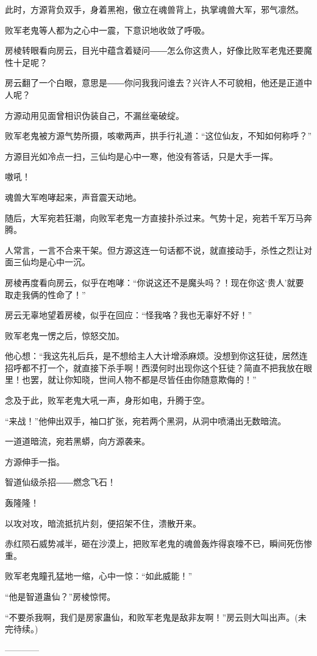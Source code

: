 \begin{this_body}
此时，方源背负双手，身着黑袍，傲立在魂兽背上，执掌魂兽大军，邪气凛然。

败军老鬼等人都为之心中一震，下意识地收敛了呼吸。

房棱转眼看向房云，目光中蕴含着疑问――怎么你这贵人，好像比败军老鬼还要魔性十足呢？

房云翻了一个白眼，意思是――你问我我问谁去？兴许人不可貌相，他还是正道中人呢？

方源动用见面曾相识伪装自己，不漏丝毫破绽。

败军老鬼被方源气势所摄，咳嗽两声，拱手行礼道：“这位仙友，不知如何称呼？”

方源目光如冷点一扫，三仙均是心中一寒，他没有答话，只是大手一挥。

嗷吼！

魂兽大军咆哮起来，声音震天动地。

随后，大军宛若狂潮，向败军老鬼一方直接扑杀过来。气势十足，宛若千军万马奔腾。

人常言，一言不合来干架。但方源这连一句话都不说，就直接动手，杀性之烈让对面三仙均是心中一沉。

房棱再度看向房云，似乎在咆哮：“你说这还不是魔头吗？！现在你这‘贵人’就要取走我俩的性命了！”

房云无辜地望着房棱，似乎在回应：“怪我咯？我也无辜好不好！”

败军老鬼一愣之后，惊怒交加。

他心想：“我这先礼后兵，是不想给主人大计增添麻烦。没想到你这狂徒，居然连招呼都不打一个，就直接下杀手啊！西漠何时出现你这个狂徒？简直不把我放在眼里！也罢，就让你知晓，世间人物不都是尽皆任由你随意欺侮的！”

念及于此，败军老鬼大吼一声，身形如电，升腾于空。

“来战！”他伸出双手，袖口扩张，宛若两个黑洞，从洞中喷涌出无数暗流。

一道道暗流，宛若黑蟒，向方源袭来。

方源伸手一指。

智道仙级杀招――燃念飞石！

轰隆隆！

以攻对攻，暗流抵抗片刻，便招架不住，溃散开来。

赤红陨石威势减半，砸在沙漠上，把败军老鬼的魂兽轰炸得哀嚎不已，瞬间死伤惨重。

败军老鬼瞳孔猛地一缩，心中一惊：“如此威能！”

“他是智道蛊仙？”房棱惊愕。

“不要杀我啊，我们是房家蛊仙，和败军老鬼是敌非友啊！”房云则大叫出声。(未完待续。)

------------

\end{this_body}

